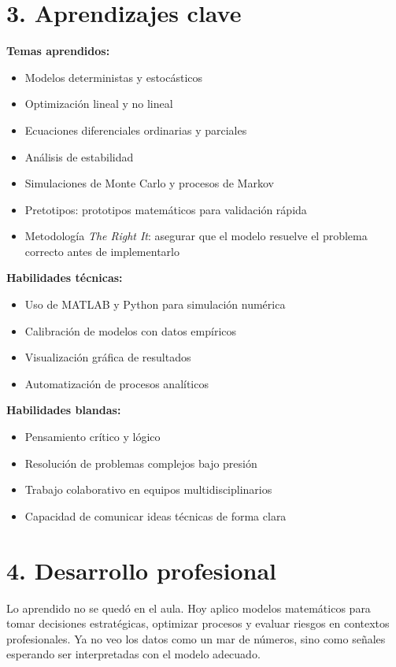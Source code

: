 \documentclass[12pt]{article}
\begin{document}
\section*{3. Aprendizajes clave}

\textbf{Temas aprendidos:}
\begin{itemize}[leftmargin=1.5cm]
    \item Modelos deterministas y estocásticos
    \item Optimización lineal y no lineal
    \item Ecuaciones diferenciales ordinarias y parciales
    \item Análisis de estabilidad
    \item Simulaciones de Monte Carlo y procesos de Markov
    \item Pretotipos: prototipos matemáticos para validación rápida
    \item Metodología \textit{The Right It}: asegurar que el modelo resuelve el problema correcto antes de implementarlo
\end{itemize}

\textbf{Habilidades técnicas:}
\begin{itemize}[leftmargin=1.5cm]
    \item Uso de MATLAB y Python para simulación numérica
    \item Calibración de modelos con datos empíricos
    \item Visualización gráfica de resultados
    \item Automatización de procesos analíticos
\end{itemize}

\textbf{Habilidades blandas:}
\begin{itemize}[leftmargin=1.5cm]
    \item Pensamiento crítico y lógico
    \item Resolución de problemas complejos bajo presión
    \item Trabajo colaborativo en equipos multidisciplinarios
    \item Capacidad de comunicar ideas técnicas de forma clara
\end{itemize}

\section*{4. Desarrollo profesional}

Lo aprendido no se quedó en el aula. Hoy aplico modelos matemáticos para tomar decisiones estratégicas, optimizar procesos y evaluar riesgos en contextos profesionales. Ya no veo los datos como un mar de números, sino como señales esperando ser interpretadas con el modelo adecuado.
\end{document}
